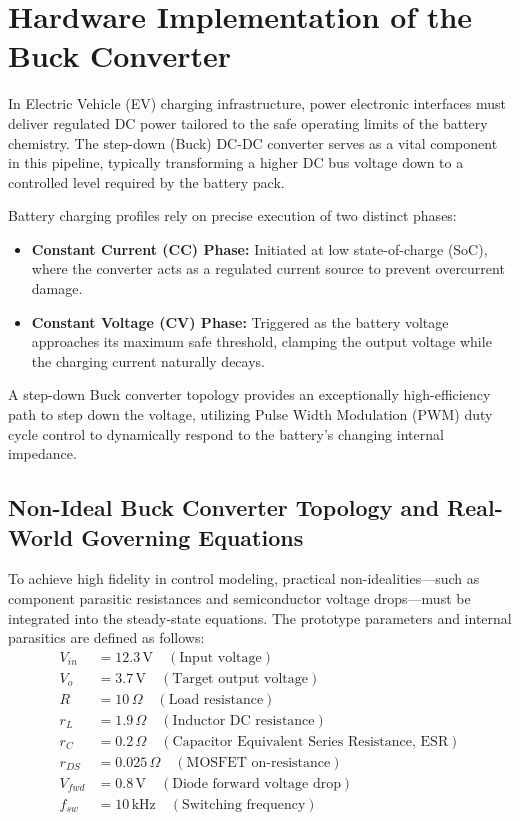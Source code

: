 \documentclass[12pt,a4paper]{article}
\begin{document}
\section{Hardware Implementation of the Buck Converter}
In Electric Vehicle (EV) charging infrastructure, power electronic interfaces must deliver regulated DC power tailored to the safe operating limits of the battery chemistry. The step-down (Buck) DC-DC converter serves as a vital component in this pipeline, typically transforming a higher DC bus voltage down to a controlled level required by the battery pack. 

Battery charging profiles rely on precise execution of two distinct phases:
\begin{itemize}
    \item \textbf{Constant Current (CC) Phase:} Initiated at low state-of-charge (SoC), where the converter acts as a regulated current source to prevent overcurrent damage.
    \item \textbf{Constant Voltage (CV) Phase:} Triggered as the battery voltage approaches its maximum safe threshold, clamping the output voltage while the charging current naturally decays.
\end{itemize}

A step-down Buck converter topology provides an exceptionally high-efficiency path to step down the voltage, utilizing Pulse Width Modulation (PWM) duty cycle control to dynamically respond to the battery's changing internal impedance.

\subsection{Non-Ideal Buck Converter Topology and Real-World Governing Equations}
To achieve high fidelity in control modeling, practical non-idealities—such as component parasitic resistances and semiconductor voltage drops—must be integrated into the steady-state equations. The prototype parameters and internal parasitics are defined as follows:
\begin{align*}
V_{in} &= 12.3\,\text{V} \quad (\text{Input voltage}) \\
V_o &= 3.7\,\text{V} \quad (\text{Target output voltage}) \\
R &= 10\,\Omega \quad (\text{Load resistance}) \\
r_L &= 1.9\,\Omega \quad (\text{Inductor DC resistance}) \\
r_C &= 0.2\,\Omega \quad (\text{Capacitor Equivalent Series Resistance, ESR}) \\
r_{DS} &= 0.025\,\Omega \quad (\text{MOSFET on-resistance}) \\
V_{fwd} &= 0.8\,\text{V} \quad (\text{Diode forward voltage drop}) \\
f_{sw} &= 10\,\text{kHz} \quad (\text{Switching frequency})
\end{align*}
\end{document}
